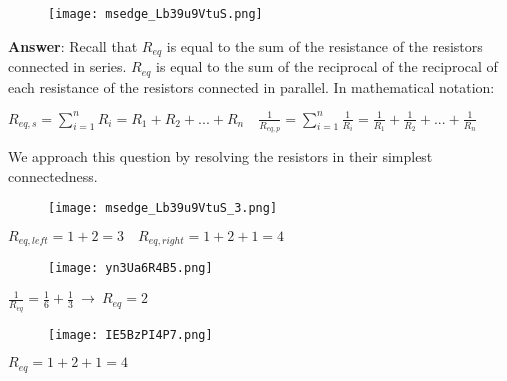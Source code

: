 \documentclass{article}
\begin{document}
\begin{figure}[H]
    \centering
    \texttt{[image: msedge\_Lb39u9VtuS.png]}
\end{figure}

{\Large \textbf{Answer}: Recall that $R_{eq}$ is equal to the sum of the resistance of the resistors connected in series. $R_{eq}$ is equal to the sum of the reciprocal of the reciprocal of each resistance of the resistors connected in parallel. In mathematical notation:}

{\vspace{4mm}}

\begin{center}
{\Large $\displaystyle R_{eq, s} = \sum_{i=1}^{n} R_{i} = R_1 + R_2 + {...} + R_n \quad  \frac{1}{R_{eq, p}} = \sum_{i=1}^{n} \frac{1}{R_{i}} = \frac{1}{R_{1}} + \frac{1}{R_{2}} + {...} + \frac{1}{R_{n}} $}
\end{center}

{\vspace{4mm}}

{\Large We approach this question by resolving the resistors in their simplest connectedness.}

\begin{figure}[H]
    \centering
    \texttt{[image: msedge\_Lb39u9VtuS\_3.png]}
\end{figure}

\begin{center}
{\Large $R_{eq, left} = 1 + 2 = 3 \quad R_{eq, right} = 1 + 2 + 1 = 4$}
\end{center}

{\vspace{8mm}}

\begin{figure}[H]
    \centering
    \texttt{[image: yn3Ua6R4B5.png]}
\end{figure}

\begin{center}
{ \Large $\displaystyle \frac{1}{R_{eq}} = \frac{1}{6} + \frac{1}{3} \ \rightarrow \ R_{eq} = 2$}
\end{center}

{\vspace{8mm}}

\begin{figure}[H]
    \centering
    \texttt{[image: IE5BzPI4P7.png]}
\end{figure}

\begin{center}
{\Large $\displaystyle R_{eq} = 1 + 2 + 1 = 4$}
\end{center}
\end{document}
